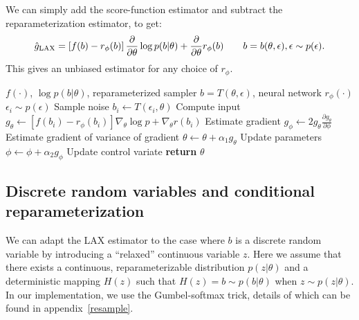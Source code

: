 \documentclass{article}
\newcommand{\E}{\mathbb{E}}
\newcommand{\PT}{\frac{\partial}{\partial \theta}}
\newcommand{\LP}[1]{\PT \log p(#1)}
\newcommand{\LAX}{{\textnormal{LAX}}}
\newcommand{\RELAX}{{\textnormal{RELAX}}}
\begin{document}
%
%
%
We can simply add the score-function estimator and subtract the reparameterization estimator, to get:
%
\begin{align}
\label{eq:cont_est}
\hat g_\LAX = \left[ f(b) -r_\phi(b) \right] \PT \log p(b|\theta) + \PT r_\phi(b) \qquad b = b(\theta, \epsilon), \epsilon \sim p(\epsilon).
\end{align}
%
This gives an unbiased estimator for any choice of $r_\phi$.


\begin{algorithm}[h]
\begin{algorithmic}
\Require $f(\cdot)$, $\log p(b|\theta)$, reparameterized sampler $b = T(\theta, \epsilon)$, neural network $r_\phi(\cdot)$
	\State $\epsilon_{i} \sim p(\epsilon)$ \Comment Sample noise
	\State $b_i \leftarrow T(\epsilon_i, \theta)$ \Comment Compute input
	\State  $g_\theta \leftarrow \left[f(b_i) - r_{\phi}(b_i) \right] \nabla_\theta \log p + \nabla_\theta r(b_i)$ \Comment Estimate gradient
	\State  $g_\phi \leftarrow 2 g_\theta \frac{\partial g_\theta}{\partial \phi}$ \Comment Estimate gradient of variance of gradient
	\State $\theta \leftarrow \theta + \alpha_1 g_\theta$ \Comment Update parameters
	\State $\phi \leftarrow \phi + \alpha_2 g_\phi$ \Comment Update control variate
\EndWhile
\State \textbf{return} $\theta$ 
\end{algorithmic}
\caption{\LAX{}: Optimizing parameters and a gradient control variate simultaneously.}
\label{lax}
\end{algorithm}

\subsection{Discrete random variables and conditional reparameterization}
We can adapt the \LAX{} estimator to the case where $b$ is a discrete random variable by introducing a ``relaxed'' continuous variable $z$. %
Here we assume that there exists a continuous, reparameterizable distribution $p(z|\theta)$ and a deterministic mapping $H(z)$ such that $H(z) = b \sim p(b|\theta)$ when $z \sim p(z|\theta)$.
In our implementation, we use the Gumbel-softmax trick, details of which can be found in appendix~\ref{resample}.
\end{document}

